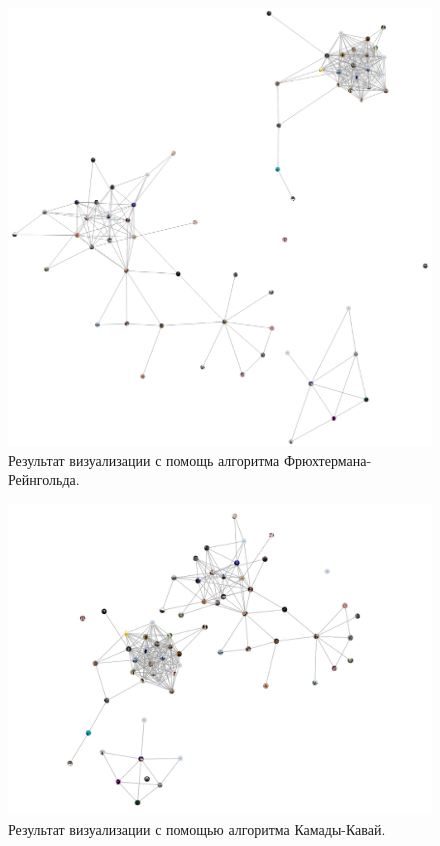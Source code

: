 \documentclass[14pt, russian]{scrartcl}
\begin{document}
\begin{figure}[H]
	\centering
	\begin{minipage}[t]{.7\textwidth}
		\centering
		\includegraphics[width=.7\textwidth]{./imgs/fr.png}
	\end{minipage}
	\caption{Результат визуализации с помощь алгоритма Фрюхтермана-Рейнгольда.}
	\label{fig:fr_result}
\end{figure}


\begin{figure}[H]
	\centering
	\begin{minipage}[t]{.9\textwidth}
		\centering
		\includegraphics[width=.9\textwidth]{./imgs/kk.png}
	\end{minipage}
	\caption{Результат визуализации с помощью алгоритма Камады-Кавай.}
	\label{fig:kk_result}
\end{figure}
\end{document}
